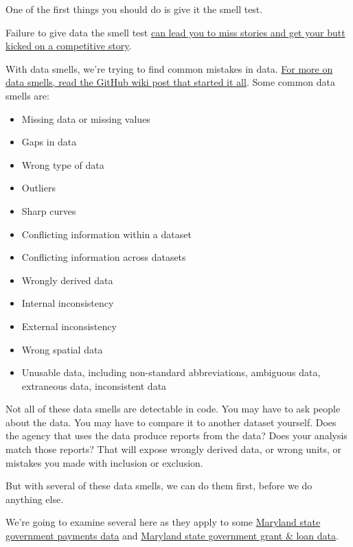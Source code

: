 \documentclass[
  letterpaper,
  DIV=11,
  numbers=noendperiod]{scrreprt}
\providecommand{\tightlist}{%
  \setlength{\itemsep}{0pt}\setlength{\parskip}{0pt}}\usepackage{longtable,booktabs,array}
\begin{document}
One of the first things you should do is give it the smell test.

Failure to give data the smell test
\href{https://source.opennews.org/en-US/learning/handling-data-about-race-and-ethnicity/}{can
lead you to miss stories and get your butt kicked on a competitive
story}.

With data smells, we're trying to find common mistakes in data.
\href{https://github.com/nikeiubel/data-smells/wiki/Ensuring-Accuracy-in-Data-Journalism}{For
more on data smells, read the GitHub wiki post that started it all}.
Some common data smells are:

\begin{itemize}
\tightlist
\item
  Missing data or missing values
\item
  Gaps in data
\item
  Wrong type of data
\item
  Outliers
\item
  Sharp curves
\item
  Conflicting information within a dataset
\item
  Conflicting information across datasets
\item
  Wrongly derived data
\item
  Internal inconsistency
\item
  External inconsistency
\item
  Wrong spatial data
\item
  Unusable data, including non-standard abbreviations, ambiguous data,
  extraneous data, inconsistent data
\end{itemize}

Not all of these data smells are detectable in code. You may have to ask
people about the data. You may have to compare it to another dataset
yourself. Does the agency that uses the data produce reports from the
data? Does your analysis match those reports? That will expose wrongly
derived data, or wrong units, or mistakes you made with inclusion or
exclusion.

But with several of these data smells, we can do them first, before we
do anything else.

We're going to examine several here as they apply to some
\href{https://opendata.maryland.gov/Budget/State-of-Maryland-Payments-Data-FY2008-to-FY2024/7syw-q4cy}{Maryland
state government payments data} and
\href{https://opendata.maryland.gov/Budget/State-of-Maryland-Grant-and-Loan-Data-FY2009-to-FY/absk-avps}{Maryland
state government grant \& loan data}.
\end{document}
